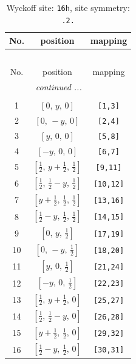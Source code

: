 \documentclass[fleqn,8pt]{jsarticle}
\begin{document}
\begin{longtable}{ccc}
\caption{Wyckoff site: {\tt 16h}, site symmetry: {\tt .2.}}
 \\
 \hline \hline
No. & position & mapping \\ \hline \endfirsthead

\multicolumn{2}{l}{\tablename\ \thetable{}} \\
 \hline \hline
No. & position & mapping \\ \hline \endhead

 \hline \hline
\multicolumn{2}{r}{\footnotesize\it continued ...} \\ \endfoot

 \hline \hline
\multicolumn{2}{r}{} \\ \endlastfoot

1 & $\left[ 0,\, y,\, 0 \right]$ & {\tt [1,3]} \\ \hline
2 & $\left[ 0,\, - y,\, 0 \right]$ & {\tt [2,4]} \\ \hline
3 & $\left[ y,\, 0,\, 0 \right]$ & {\tt [5,8]} \\ \hline
4 & $\left[ - y,\, 0,\, 0 \right]$ & {\tt [6,7]} \\ \hline
5 & $\left[ \frac{1}{2},\, y + \frac{1}{2},\, \frac{1}{2} \right]$ & {\tt [9,11]} \\ \hline
6 & $\left[ \frac{1}{2},\, \frac{1}{2} - y,\, \frac{1}{2} \right]$ & {\tt [10,12]} \\ \hline
7 & $\left[ y + \frac{1}{2},\, \frac{1}{2},\, \frac{1}{2} \right]$ & {\tt [13,16]} \\ \hline
8 & $\left[ \frac{1}{2} - y,\, \frac{1}{2},\, \frac{1}{2} \right]$ & {\tt [14,15]} \\ \hline
9 & $\left[ 0,\, y,\, \frac{1}{2} \right]$ & {\tt [17,19]} \\ \hline
10 & $\left[ 0,\, - y,\, \frac{1}{2} \right]$ & {\tt [18,20]} \\ \hline
11 & $\left[ y,\, 0,\, \frac{1}{2} \right]$ & {\tt [21,24]} \\ \hline
12 & $\left[ - y,\, 0,\, \frac{1}{2} \right]$ & {\tt [22,23]} \\ \hline
13 & $\left[ \frac{1}{2},\, y + \frac{1}{2},\, 0 \right]$ & {\tt [25,27]} \\ \hline
14 & $\left[ \frac{1}{2},\, \frac{1}{2} - y,\, 0 \right]$ & {\tt [26,28]} \\ \hline
15 & $\left[ y + \frac{1}{2},\, \frac{1}{2},\, 0 \right]$ & {\tt [29,32]} \\ \hline
16 & $\left[ \frac{1}{2} - y,\, \frac{1}{2},\, 0 \right]$ & {\tt [30,31]} \\
\end{longtable}
\end{document}
